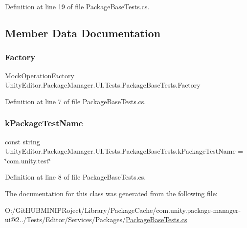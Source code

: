 Definition at line 19 of file Package\+Base\+Tests.\+cs.



\subsection{Member Data Documentation}
\mbox{\label{class_unity_editor_1_1_package_manager_1_1_u_i_1_1_tests_1_1_package_base_tests_af2b2bd5acb144a46619ffa922f01d080}} 
\subsubsection{\texorpdfstring{Factory}{Factory}}
{\footnotesize\ttfamily \mbox{\hyperlink{class_unity_editor_1_1_package_manager_1_1_u_i_1_1_tests_1_1_mock_operation_factory}{Mock\+Operation\+Factory}} Unity\+Editor.\+Package\+Manager.\+U\+I.\+Tests.\+Package\+Base\+Tests.\+Factory\hspace{0.3cm}{\ttfamily [protected]}}



Definition at line 7 of file Package\+Base\+Tests.\+cs.

\mbox{\label{class_unity_editor_1_1_package_manager_1_1_u_i_1_1_tests_1_1_package_base_tests_abc4043fbd68eb046d466063f1f5b7bf1}} 
\subsubsection{\texorpdfstring{kPackageTestName}{kPackageTestName}}
{\footnotesize\ttfamily const string Unity\+Editor.\+Package\+Manager.\+U\+I.\+Tests.\+Package\+Base\+Tests.\+k\+Package\+Test\+Name = \char`\"{}com.\+unity.\+test\char`\"{}\hspace{0.3cm}{\ttfamily [protected]}}



Definition at line 8 of file Package\+Base\+Tests.\+cs.



The documentation for this class was generated from the following file\+:\begin{DoxyCompactItemize}
\item 
O\+:/\+Git\+H\+U\+B\+M\+I\+N\+I\+P\+Roject/\+Library/\+Package\+Cache/com.\+unity.\+package-\/manager-\/ui@2../\+Tests/\+Editor/\+Services/\+Packages/\mbox{\hyperlink{_package_base_tests_8cs}{Package\+Base\+Tests.\+cs}}\end{DoxyCompactItemize}
